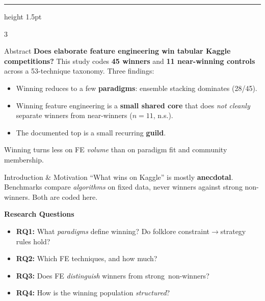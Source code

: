 \documentclass[a0,portrait]{a0poster}
\begin{document}
\vspace{0.3cm}
{\color{BCSilver}\hrule height 1.5pt}
\vspace{0.4cm}

\raggedright
{}
\large

\begin{multicols}{3}

\begin{posterblock}{Abstract}
\textbf{Does elaborate feature engineering win tabular Kaggle competitions?} This study codes
\textbf{45 winners} and \textbf{11 near-winning controls} across a 53-technique taxonomy.
Three findings:
\begin{itemize}[leftmargin=1.4em,itemsep=4pt,topsep=4pt]
  \item Winning reduces to a few \textbf{paradigms}: ensemble stacking dominates (28/45).
  \item Winning feature engineering is a \textbf{small shared core} that does \emph{not cleanly} separate winners from near-winners ($n=11$, n.s.).
  \item The documented top is a small recurring \textbf{guild}.
\end{itemize}
Winning turns less on FE \emph{volume} than on paradigm fit and community membership.
\end{posterblock}

\begin{posterblock}{Introduction \& Motivation}
``What wins on Kaggle'' is mostly \textbf{anecdotal}. Benchmarks compare \emph{algorithms}
on fixed data, never winners against strong non-winners. Both are coded here.

\vspace{0.5em}
\textbf{Research Questions}
\begin{itemize}[leftmargin=1.4em,itemsep=5pt,topsep=4pt]
  \item \textbf{RQ1:} What \emph{paradigms} define winning? Do folklore constraint$\rightarrow$strategy rules hold?
  \item \textbf{RQ2:} Which FE techniques, and how much?
  \item \textbf{RQ3:} Does FE \emph{distinguish} winners from strong~non-winners?
  \item \textbf{RQ4:} How is the winning population \emph{structured}?
\end{itemize}
\end{posterblock}


\end{multicols}
\end{document}
